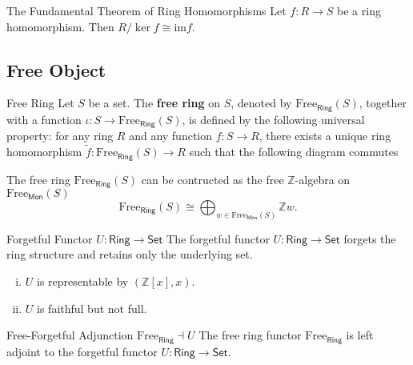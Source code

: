 \begin{theorem}{The Fundamental Theorem of Ring Homomorphisms}{}
    Let $f:R\to S$ be a ring homomorphism. Then $R/\ker f\cong \mathrm{im}f$.
\end{theorem}


\subsection{Free Object}
\begin{definition}{Free Ring}{}
    Let $S$ be a set. The \textbf{free ring} on $S$, denoted by $\mathrm{Free}_{\mathsf{Ring}}(S)$, together with a function $\iota:S\to \mathrm{Free}_{\mathsf{Ring}}(S)$, is defined by the following universal property: for any ring $R$ and any function $f:S\to R$, there exists a unique ring homomorphism $\widetilde{f}:\mathrm{Free}_{\mathsf{Ring}}(S)\to R$ such that the following diagram commutes
    \begin{center}
    \end{center}
    The free ring $\mathrm{Free}_{\mathsf{Ring}}(S)$ can be contructed as the free $\mathbb{Z}$-algebra on $\mathrm{Free}_{\mathsf{Mon}}(S)$
    \[
        \mathrm{Free}_{\mathsf{Ring}}(S)\cong\bigoplus_{w\in\mathrm{Free}_{\mathsf{Mon}}(S)}\mathbb{Z}w.  
    \]
\end{definition}


\begin{example}{Forgetful Functor $U:\mathsf{Ring}\to\mathsf{Set}$}{}
    The forgetful functor $U:\mathsf{Ring}\to\mathsf{Set}$ forgets the ring structure and retains only the underlying set.
    \begin{enumerate}[(i)]
        \item $U$ is representable by $\left(\mathbb{Z}[x],x\right)$.
        \item $U$ is faithful but not full.
    \end{enumerate}
\end{example}


\begin{proposition}{Free-Forgetful Adjunction $\mathrm{Free}_{\mathsf{Ring}}\dashv U$}{}
    The free ring functor $\mathrm{Free}_{\mathsf{Ring}}$ is left adjoint to the forgetful functor $U:\mathsf{Ring}\to\mathsf{Set}$.
\end{proposition}




